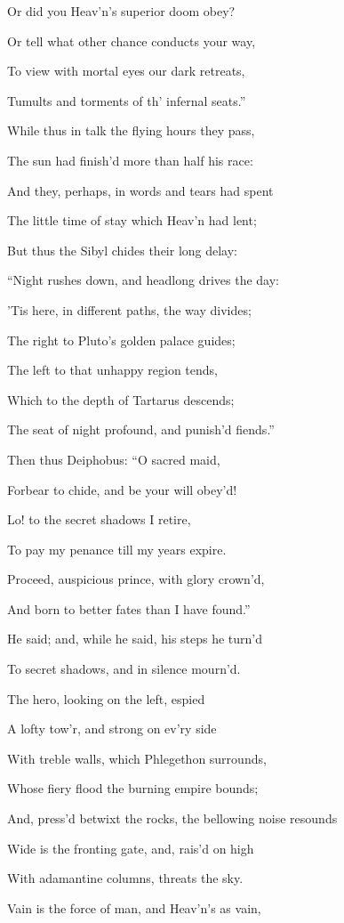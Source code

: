 Or did you Heav’n’s superior doom obey?

Or tell what other chance conducts your way,

To view with mortal eyes our dark retreats,

Tumults and torments of th’ infernal seats.”

While thus in talk the flying hours they pass,

The sun had finish’d more than half his race:

And they, perhaps, in words and tears had spent

The little time of stay which Heav’n had lent;

But thus the Sibyl chides their long delay:

“Night rushes down, and headlong drives the day:

’Tis here, in different paths, the way divides;

The right to Pluto’s golden palace guides;

The left to that unhappy region tends,

Which to the depth of Tartarus descends;

The seat of night profound, and punish’d fiends.”

Then thus Deiphobus: “O sacred maid,

Forbear to chide, and be your will obey’d!

Lo! to the secret shadows I retire,

To pay my penance till my years expire.

Proceed, auspicious prince, with glory crown’d,

And born to better fates than I have found.”

He said; and, while he said, his steps he turn’d

To secret shadows, and in silence mourn’d.

The hero, looking on the left, espied

A lofty tow’r, and strong on ev’ry side

With treble walls, which Phlegethon surrounds,

Whose fiery flood the burning empire bounds;

And, press’d betwixt the rocks, the bellowing noise resounds

Wide is the fronting gate, and, rais’d on high

With adamantine columns, threats the sky.

Vain is the force of man, and Heav’n’s as vain,

